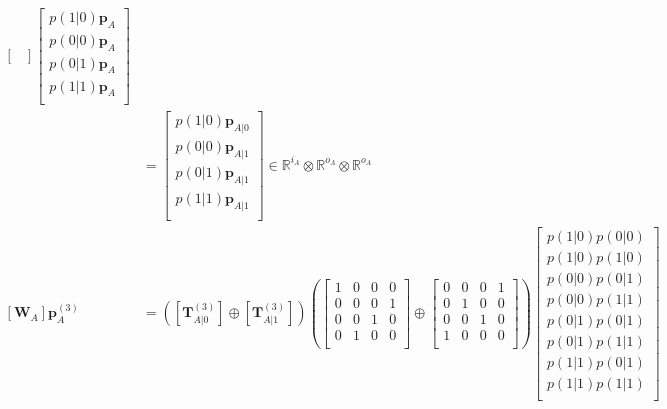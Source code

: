 \documentclass[10pt, a4paper]{article}
\numberwithin{equation}{section} %
\theoremstyle{definition}
\theoremstyle{plain}
\newcommand{\?}{\mathrel{?}} %
\newcommand{\R}{\mathbb{R}} %
\newcommand{\cvec}[1]{\boldsymbol{\mathbf{#1}}}    %
\newcommand{\matrp}[2]{\left[\mathbf{#1}#2\right]} %
\begin{document}
\begin{align}
\begin{bmatrix}
        \end{bmatrix}
        \begin{bmatrix} 
          p(1|0) \cvec{p}_A \\ p(0|0) \cvec{p}_A \\
          p(0|1) \cvec{p}_A \\ p(1|1) \cvec{p}_A \\ 
        \end{bmatrix} \\
                                                               &=
        \begin{bmatrix} 
          p(1|0) \cvec{p}_{A|0} \\ p(0|0) \cvec{p}_{A|1} \\
          p(0|1) \cvec{p}_{A|1} \\ p(1|1) \cvec{p}_{A|1} \\ 
        \end{bmatrix} \in \R^{i_A} \otimes \R^{o_A} \otimes \R^{o_A} \\
              \matrp{W}{_A} \cvec{p}_A^{(3)} &= \left( \matrp{T}{_{A|0}^{(3)}} \oplus \matrp{T}{_{A|1}^{(3)}} \right)
                 \left(\begin{bmatrix}
          1 & 0 & 0 & 0 \\
          0 & 0 & 0 & 1 \\
          0 & 0 & 1 & 0 \\
          0 & 1 & 0 & 0 \\
          \end{bmatrix} \oplus \begin{bmatrix}
          0 & 0 & 0 & 1 \\
          0 & 1 & 0 & 0 \\
          0 & 0 & 1 & 0 \\
          1 & 0 & 0 & 0 \\
          \end{bmatrix}\right)
          \begin{bmatrix} 
            p(1|0) p(0|0) \\ p(1|0) p(1|0) \\ p(0|0) p(0|1) \\ p(0|0) p(1|1) \\
            p(0|1) p(0|1) \\ p(0|1) p(1|1) \\ p(1|1) p(0|1) \\ p(1|1) p(1|1) \\ 
          \end{bmatrix} \\

\end{align}
\end{document}
